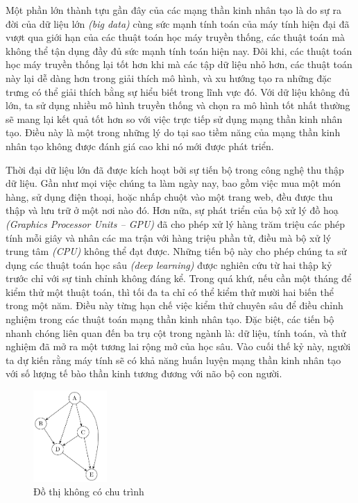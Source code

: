 Một phần lớn thành tựu gần đây của các mạng thần kinh nhân tạo là do sự ra đời của dữ liệu lớn \textit{(big data)} cùng sức mạnh tính toán của máy tính hiện đại đã vượt qua giới hạn của các thuật toán học máy truyền thống, các thuật toán mà không thể tận dụng đầy đủ sức mạnh tính toán hiện nay. Đôi khi, các thuật toán học máy truyền thống lại tốt hơn khi mà các tập dữ liệu nhỏ hơn, các thuật toán này lại dễ dàng hơn trong giải thích mô hình, và xu hướng tạo ra những đặc trưng có thể giải thích bằng sự hiểu biết trong lĩnh vực đó. Với dữ liệu không đủ lớn, ta sử dụng nhiều mô hình truyền thống và chọn ra mô hình tốt nhất thường sẽ mang lại kết quả tốt hơn so với việc trực tiếp sử dụng mạng thần kinh nhân tạo. Điều này là một trong những lý do tại sao tiềm năng của mạng thần kinh nhân tạo không được đánh giá cao khi nó mới được phát triển.

Thời đại dữ liệu lớn đã được kích hoạt bởi sự tiến bộ trong công nghệ thu thập dữ liệu. Gần như mọi việc chúng ta làm ngày nay, bao gồm việc mua một món hàng, sử dụng điện thoại, hoặc nhấp chuột vào một trang web, đều được thu thập và lưu trữ ở một nơi nào đó. Hơn nữa, sự phát triển của bộ xử lý đồ hoạ \textit{(Graphics Processor Units – GPU)} đã cho phép xử lý hàng trăm triệu các phép tính mỗi giây và nhân các ma trận với hàng triệu phần tử, điều mà bộ xử lý trung tâm \textit{(CPU)} không thể đạt được. Những tiến bộ này cho phép chúng ta sử dụng các thuật toán học sâu \textit{(deep learning)} được nghiên cứu từ hai thập kỷ trước chỉ với sự tinh chỉnh không đáng kể. Trong quá khứ, nếu cần một tháng để kiểm thử một thuật toán, thì tối đa ta chỉ có thể kiểm thử mười hai biến thể trong một năm. Điều này từng hạn chế việc kiểm thử chuyên sâu để điều chỉnh nghiệm trong các thuật toán mạng thần kinh nhân tạo. Đặc biệt, các tiến bộ nhanh chóng liên quan đến ba trụ cột trong ngành là: dữ liệu, tính toán, và thử nghiệm đã mở ra một tương lai rộng mở của học sâu. Vào cuối thế kỷ này, người ta dự kiến rằng máy tính sẽ có khả năng huấn luyện mạng thần kinh nhân tạo với số lượng tế bào thần kinh tương đương với não bộ con người.\cite{Aggarwal2023}
\begin{figure}[htb]
    \centering
    \includegraphics[width=0.25\textwidth]{tikz_image/directed_acyclic_graph.pdf}
    \caption{Đồ thị không có chu trình}
    \label{figure:directed-acyclic-graph}
\end{figure}

